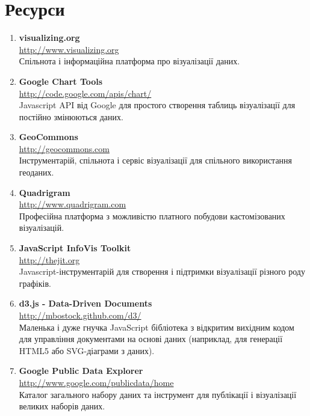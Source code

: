 \chapter{Ресурси}
\label{sec:references}

\begin{enumerate}
    \item \textbf{visualizing.org} \\
    \url{http://www.visualizing.org} \\
    Спільнота і інформаційна платформа про візуалізації даних.

    \item \textbf{Google Chart Tools} \\
    \url{http://code.google.com/apis/chart/} \\
    Javascript API від Google для простого створення таблиць візуалізації для постійно змінюються даних.

    \item \textbf{GeoCommons} \\
    \url{http://geocommons.com} \\
    Інструментарій, спільнота і сервіс візуалізації для спільного використання геоданих.

    \item \textbf{Quadrigram} \\
    \url{http://www.quadrigram.com} \\
    Професійна платформа з можливістю платного побудови кастомізованих візуалізацій.

    \item \textbf{JavaScript InfoVis Toolkit} \\
    \url{http://thejit.org} \\
    Javascript-інструментарій для створення і підтримки візуалізації різного роду графіків.

    \item \textbf{d3.js - Data-Driven Documents} \\
    \url{http://mbostock.github.com/d3/} \\
    Маленька і дуже гнучка JavaScript бібліотека з відкритим вихідним кодом для управління документами на основі даних (наприклад, для генерації HTML5 або SVG-діаграми з даних).

    \item \textbf{Google Public Data Explorer} \\
    \url{http://www.google.com/publicdata/home} \\
    Каталог загального набору даних та інструмент для публікації і візуалізації великих наборів даних.


\end{enumerate}

